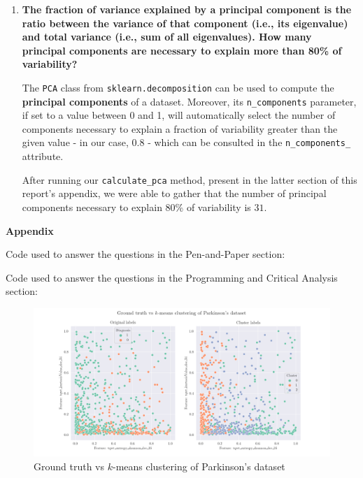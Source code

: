 \documentclass[12pt]{article}
\begin{document}
\begin{enumerate}[leftmargin=\labelsep]
  \item \textbf{The fraction of variance explained by a principal component is the ratio between the
          variance of that component (i.e., its eigenvalue) and total variance (i.e., sum of all eigenvalues).
          How many principal components are necessary to explain more than 80\% of variability?}

        The \texttt{PCA} class from \texttt{sklearn.decomposition} can be used to
        compute the \textbf{principal components} of a dataset. Moreover, its
        \texttt{n\_components} parameter, if set to a value between 0 and 1, will
        automatically select the number of components necessary to explain a fraction
        of variability greater than the given value - in our case, 0.8 - which can
        be consulted in the \texttt{n\_components\_} attribute.

        After running our \texttt{calculate\_pca} method, present in the latter
        section of this report's appendix, we were able to gather that the
        number of principal components necessary to explain 80\% of variability
        is $31$.

\end{enumerate}

\pagebreak

\large{\textbf{Appendix}\vskip 0.3cm}

Code used to answer the questions in the Pen-and-Paper section:



\pagebreak

Code used to answer the questions in the Programming and Critical Analysis section:



\vskip 2cm

\begin{figure}[H]
  \centering
  \includegraphics[width=\textwidth]{../assets/parkinsons.png}
  \caption{Ground truth vs $k$-means clustering of Parkinson's dataset}
  \label{fig:diagnoses-plots}
\end{figure}
\end{document}

